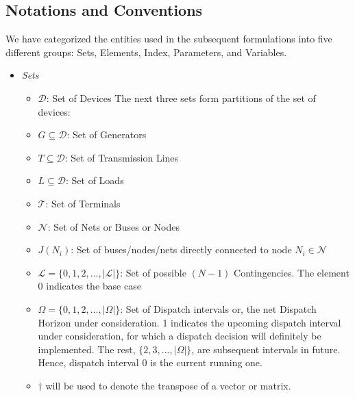 \documentclass[preprint,12pt,3p]{elsarticle}
\begin{document}
\subsection{Notations and Conventions}
\label{notations}
We have categorized the entities used in the subsequent formulations into five different groups: Sets, Elements, Index, Parameters, and Variables.\\
\begin{itemize}
    \item \textit{Sets}
    \begin{itemize}[label={}]
        \item $\mathcal{D}$: Set of Devices
        The next three sets form partitions of the set of devices:
        \item $G\subseteq\mathcal{D}$: Set of Generators
        \item $T\subseteq\mathcal{D}$: Set of Transmission Lines
        \item $L\subseteq\mathcal{D}$: Set of Loads
        \item $\mathcal{T}$: Set of Terminals
        \item $\mathcal{N}$: Set of Nets or Buses or Nodes
        \item $J(N_i)$: Set of buses/nodes/nets directly connected to node $N_i\in\mathcal{N}$
        \item $\mathcal{L}=\{0,1,2,...,|\mathcal{L}|\}$: Set of possible $(N-1)$ Contingencies. The element 0 indicates the base case
        \item $\Omega=\{0, 1, 2, ..., |\Omega|\}$: Set of Dispatch intervals or, the net Dispatch Horizon under consideration. 1 indicates the upcoming dispatch interval under consideration, for which a dispatch decision will definitely be implemented. The rest, $\{2, 3, ..., |\Omega|\}$, are subsequent intervals in future. Hence, dispatch interval $0$  is the current running one. 
        \item $\dagger$ will be used to denote the transpose of a vector or matrix.

\end{itemize}
\end{itemize}
\end{document}
